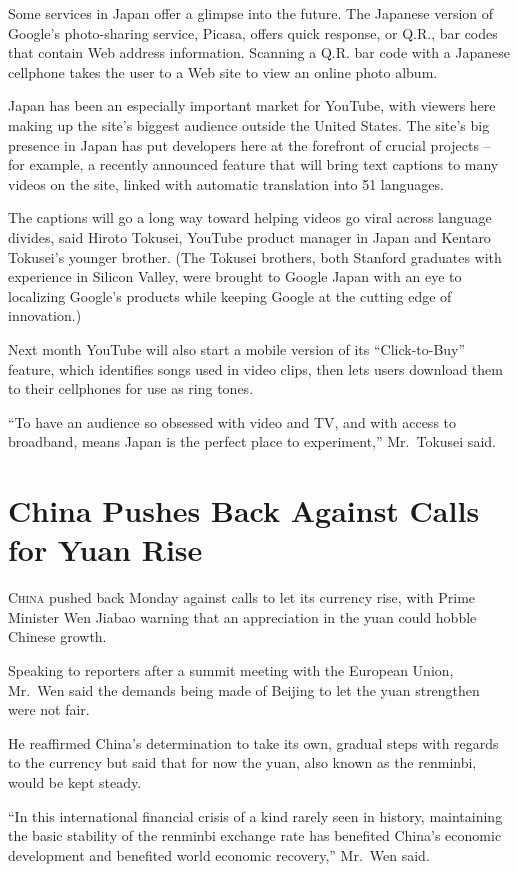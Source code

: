 ﻿\documentclass[12pt]{article}
\begin{document}
Some services in Japan offer a glimpse into the future. The Japanese version of Google's
photo-sharing service, Picasa, offers quick response, or Q.R., bar codes that contain Web address
information. Scanning a Q.R. bar code with a Japanese cellphone takes the user to a Web site to view
an online photo album.

Japan has been an especially important market for YouTube, with viewers here making up the site's
biggest audience outside the United States. The site's big presence in Japan has put developers here
at the forefront of crucial projects -- for example, a recently announced feature that will bring
text captions to many videos on the site, linked with automatic translation into 51 languages.

The captions will go a long way toward helping videos go viral across language divides, said Hiroto
Tokusei, YouTube product manager in Japan and Kentaro Tokusei's younger brother. (The Tokusei
brothers, both Stanford graduates with experience in Silicon Valley, were brought to Google Japan
with an eye to localizing Google's products while keeping Google at the cutting edge of innovation.)

Next month YouTube will also start a mobile version of its ``Click-to-Buy'' feature, which
identifies songs used in video clips, then lets users download them to their cellphones for use as
ring tones.

``To have an audience so obsessed with video and TV, and with access to broadband, means Japan is
the perfect place to experiment,'' Mr.~Tokusei said.

\section{China Pushes Back Against Calls for Yuan Rise}

\lettrine{C}{hina} pushed back Monday against calls to let its currency
rise, with Prime Minister Wen Jiabao warning that an appreciation in the yuan could hobble Chinese
growth.

Speaking to reporters after a summit meeting with the European Union, Mr.~Wen said the demands being
made of Beijing to let the yuan strengthen were not fair.

He reaffirmed China's determination to take its own, gradual steps with regards to the currency but
said that for now the yuan, also known as the renminbi, would be kept steady.

``In this international financial crisis of a kind rarely seen in history, maintaining the basic
stability of the renminbi exchange rate has benefited China's economic development and benefited
world economic recovery,'' Mr.~Wen said.
\end{document}
